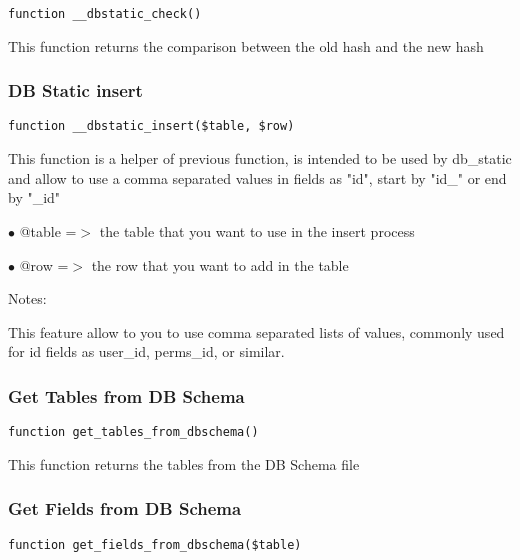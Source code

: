\documentclass[a4paper]{article}
\begin{document}
\begin{lstlisting}
function __dbstatic_check()
\end{lstlisting}

This function returns the comparison between the old hash and the new hash

\hypertarget{toc413}{}
\subsubsection{DB Static insert}

\begin{lstlisting}
function __dbstatic_insert($table, $row)
\end{lstlisting}

This function is a helper of previous function, is intended to be used by db\_static and
allow to use a comma separated values in fields as "id", start by "id\_" or end by "\_id"

\begin{compactitem}
\item[\color{myblue}$\bullet$] @table =$>$ the table that you want to use in the insert process
\item[\color{myblue}$\bullet$] @row   =$>$ the row that you want to add in the table
\end{compactitem}

Notes:

This feature allow to you to use comma separated lists of values, commonly used for id
fields as user\_id, perms\_id, or similar.

\hypertarget{toc414}{}
\subsubsection{Get Tables from DB Schema}

\begin{lstlisting}
function get_tables_from_dbschema()
\end{lstlisting}

This function returns the tables from the DB Schema file

\hypertarget{toc415}{}
\subsubsection{Get Fields from DB Schema}

\begin{lstlisting}
function get_fields_from_dbschema($table)
\end{lstlisting}
\end{document}

